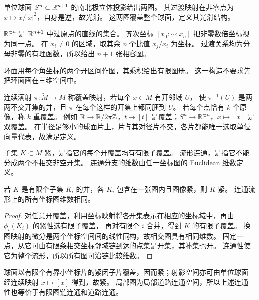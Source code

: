 \begin{example}[球面的两图]
单位球面 $S^n\subset\mathbb{R}^{n+1}$ 的南北极立体投影给出两图。
其过渡映射在非零点为 $x\mapsto x/|x|^2$，自身是逆，故光滑。
这两图覆盖整个球面，定义其光滑结构。
\end{example}
\begin{example}[射影空间]
$\mathbb{RP}^n$ 是 $\mathbb{R}^{n+1}$ 中过原点的直线的集合。
齐次坐标 $[x_0:\cdots:x_n]$ 把非零数倍坐标视为同一点。
在 $x_i\ne0$ 的区域，取其余 $n$ 个比值 $x_j/x_i$ 为坐标。
过渡关系均为分母非零的有理函数，所以给出 $n+1$ 张相容图。
\end{example}
环面用每个角坐标的两个开区间作图，其乘积给出有限图册。
这一构造不要求先把环面画在三维空间中。


\begin{definition}[覆盖映射]\label{def:covering-map}
连续满射 $\pi:\widetilde M\to M$ 称覆盖映射，若每个 $x\in M$ 有开邻域 $U$，
使 $\pi^{-1}(U)$ 是两两不交开集的并，且 $\pi$ 在每个这样的开集上都同胚到 $U$。
若每个点恰有 $k$ 个原像，称 $k$ 重覆盖。
例如 $\mathbb{R}\to\mathbb{R}/2\pi\mathbb{Z}$，$t\mapsto[t]$ 是覆盖；$S^n\to\mathbb{RP}^n$，$x\mapsto[x]$ 是双覆盖。
在半径足够小的球面片上，片与其对径片不交，各片都能唯一选取单位向量代表，故满足定义。
\end{definition}

\begin{definition}
子集 $K\subset M$ 紧，是指它的每个开覆盖均有有限子覆盖。
流形连通，是指它不能分成两个不相交非空开集。
连通分支的维数由任一坐标图的 Euclidean 维数定义。
\end{definition}
\begin{proposition}
若 $K$ 是有限个子集 $K_i$ 的并，各 $K_i$ 包含在一张图内且图像紧，则 $K$ 紧。
连通流形上的所有坐标图维数相同。
\end{proposition}
\begin{proof}
对任意开覆盖，利用坐标映射将各开集表示在相应的坐标域中，再由 $\phi_i(K_i)$ 的紧性选有限子覆盖，
再对有限个 $i$ 合并，得到 $K$ 的有限子覆盖。
换图映射的微分是两个坐标空间间的线性同构，故相交图具有相同维数。
固定一点，从它可由有限条相交坐标邻域链到达的点集是开集，其补集也开。
连通性使它为整个流形，所以所有图可沿链比较维数。
\end{proof}
球面以有限个有界小坐标片的紧闭子片覆盖，因而紧；射影空间亦可由单位球面
经连续映射 $x\mapsto[x]$ 得到，故紧。
局部图为局部道路连通空间，所以上述连通性也等价于有限图链连通和道路连通。


